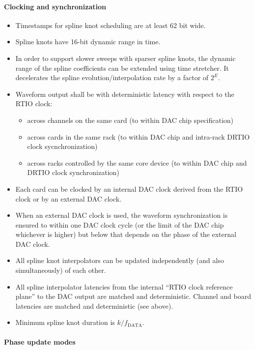 \documentclass[english]{article}
\begin{document}
\paragraph{Clocking and synchronization}

\begin{itemize}
	\item Timestamps for spline knot scheduling are at least 62 bit wide.
	\item Spline knots have 16-bit dynamic range in time.
	\item In order to support slower sweeps with sparser spline knots, the dynamic range of the spline coefficients can be extended using time stretcher.
		It decelerates the spline evolution/interpolation rate by a factor of $2^E$.
	\item Waveform output shall be with deterministic latency with respect to the RTIO clock:
		\begin{itemize}
			\item across channels on the same card (to within DAC
				chip specification)
			\item across cards in the same rack (to within DAC chip
				and intra-rack DRTIO clock sycnchronization)
			\item across racks controlled by the same core device
				(to within DAC chip and DRTIO clock synchronization)
		\end{itemize}
	\item Each card can be clocked by an internal DAC clock derived from the RTIO clock or by an external DAC clock.
	\item When an external DAC clock is used, the waveform synchronization is ensured to within one DAC clock cycle (or the limit of the DAC chip whichever is higher) but below that depends on the phase of the external DAC clock.
	\item All spline knot interpolators can be updated independently (and also simultaneously) of each other.
	\item All spline interpolator latencies from the internal ``RTIO clock reference plane'' to the DAC output are matched and deterministic.
		Channel and board latencies are matched and deterministic (see above).
	\item Minimum spline knot duration is $k/f_\mathrm{DATA}$. 
\end{itemize}

\paragraph{Phase update modes}
\end{document}
